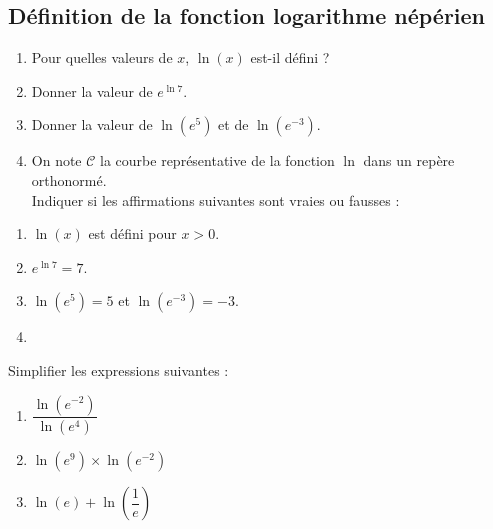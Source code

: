\documentclass[a4paper,11pt,exos]{nsi} %
\begin{document}
\maketitle

\subsection*{Définition de la fonction logarithme népérien}

\exo{} %
\begin{enumerate}
    \item Pour quelles valeurs de $x$, $\ln(x)$ est-il défini ?
    \item Donner la valeur de $e^{\ln 7}$.
    \item Donner la valeur de $\ln(e^5)$ et de $\ln(e^{-3})$.
    \item On note $\mathcal{C}$ la courbe représentative de la fonction $\ln$ dans un repère orthonormé.\\
    Indiquer si les affirmations suivantes sont vraies ou fausses :
\end{enumerate} 
\textcolor{UGLiBlue}{
    \begin{enumerate}
        \item $\ln(x)$ est défini pour $x>0$.
        \item $e^{\ln 7}=7$.
        \item $\ln(e^5)=5$ et $\ln(e^{-3})=-3$.
        \item {}
    \end{enumerate}
}

\exo{} %
Simplifier les expressions suivantes :
\begin{multicols}{3}
    \begin{enumerate}
        \item $\dfrac{\ln\left(e^{-2}\right)}{\ln\left(e^4\right)}$
        \item $\ln\left(e^9\right)\times\ln\left(e^{-2}\right)$
        \item $\ln\left(e\right)+\ln\left(\dfrac{1}{e}\right)$
    \end{enumerate}
\end{multicols}
\end{document}

